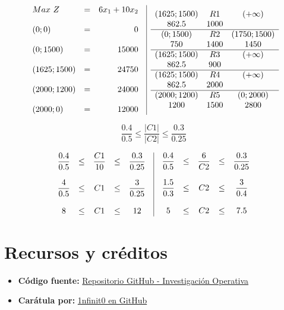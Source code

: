 \documentclass[12pt]{article}
\begin{document}
\newpage
\[
\begin{array}{c|c}
  \begin{array}{l c r}
    Max \ Z & = & 6x_1 + 10x_2 \\\\
    (0; 0) & = & 0 \\\\
    (0; 1500) & = & 15000 \\\\
    (1625; 1500) & = & 24750 \\\\
    (2000; 1200) & = & 24000 \\\\
    (2000; 0) & = & 12000
  \end{array}
  &
  \begin{array}{c c c}
    (1625; 1500) & R1 & (+\infty)\\
    862.5 & 1000 & \\
    \hline
    (0; 1500) & R2 & (1750; 1500) \\
    750 & 1400 & 1450 \\
    \hline
    (1625; 1500) & R3 & (+\infty)\\
    862.5 & 900 & \\
    \hline
    (1625; 1500) & R4 & (+\infty)\\
    862.5 & 2000 & \\
    \hline
    (2000; 1200) & R5 & (0; 2000)\\
    1200 & 1500 & 2800
  \end{array}
\end{array}
\]

\vspace{1cm}

\[ \dfrac{0.4}{0.5} \leq \dfrac{\left|C1\right|}{\left|C2\right|} \leq \dfrac{0.3}{0.25} \]

\[
\begin{array}{c|c}
  \begin{array}{c c c c c}
    \dfrac{0.4}{0.5} & \leq & \dfrac{C1}{10} & \leq & \dfrac{0.3}{0.25} \\\\
    \dfrac{4}{0.5} & \leq & C1 & \leq & \dfrac{3}{0.25} \\\\
    8 & \leq & C1 & \leq & 12
  \end{array}
  &
  \begin{array}{c c c c c}
    \dfrac{0.4}{0.5} & \leq & \dfrac{6}{C2} & \leq & \dfrac{0.3}{0.25} \\\\
    \dfrac{1.5}{0.3} & \leq & C2 & \leq & \dfrac{3}{0.4} \\\\
    5 & \leq & C2 & \leq & 7.5
  \end{array}
\end{array}
\]

\newpage
\section*{Recursos y créditos}

\begin{itemize}
  \item \textbf{Código fuente:} \href{https://github.com/MateoTVara/UTP}{Repositorio GitHub - Investigación Operativa}
  \item \textbf{Carátula por:} \href{https://github.com/1nfinit0}{1nfinit0 en GitHub}
\end{itemize}
\end{document}

